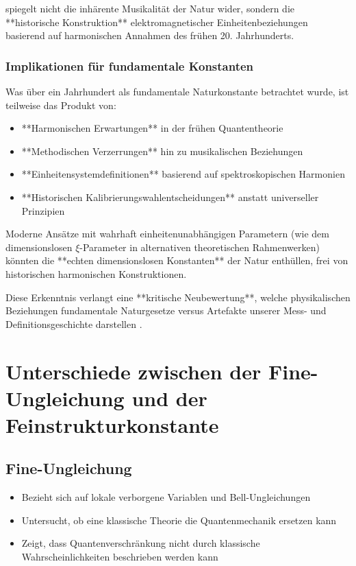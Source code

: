 \documentclass[12pt,a4paper]{article}
\begin{document}
	spiegelt nicht die inhärente Musikalität der Natur wider, sondern die **historische Konstruktion** elektromagnetischer Einheitenbeziehungen basierend auf harmonischen Annahmen des frühen 20. Jahrhunderts.
	
	\subsubsection{Implikationen für fundamentale Konstanten}
	
	Was über ein Jahrhundert als fundamentale Naturkonstante betrachtet wurde, ist teilweise das Produkt von:
	\begin{itemize}
		\item **Harmonischen Erwartungen** in der frühen Quantentheorie
		\item **Methodischen Verzerrungen** hin zu musikalischen Beziehungen  
		\item **Einheitensystemdefinitionen** basierend auf spektroskopischen Harmonien
		\item **Historischen Kalibrierungswahlentscheidungen** anstatt universeller Prinzipien
	\end{itemize}
	
	Moderne Ansätze mit wahrhaft einheitenunabhängigen Parametern (wie dem dimensionslosen $\xi$-Parameter in alternativen theoretischen Rahmenwerken) könnten die **echten dimensionslosen Konstanten** der Natur enthüllen, frei von historischen harmonischen Konstruktionen.
	
	Diese Erkenntnis verlangt eine **kritische Neubewertung**, welche physikalischen Beziehungen fundamentale Naturgesetze versus Artefakte unserer Mess- und Definitionsgeschichte darstellen \cite{Weinberg1995, Parker2018}.
	
	\section{Unterschiede zwischen der Fine-Ungleichung und der Feinstrukturkonstante}
	
	\subsection{Fine-Ungleichung}
	\begin{itemize}
		\item Bezieht sich auf lokale verborgene Variablen und Bell-Ungleichungen
		\item Untersucht, ob eine klassische Theorie die Quantenmechanik ersetzen kann
		\item Zeigt, dass Quantenverschränkung nicht durch klassische Wahrscheinlichkeiten beschrieben werden kann
	\end{itemize}
	
\end{document}
